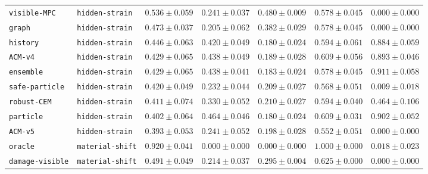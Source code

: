 \documentclass{article}
\begin{document}
\begin{center}
\begin{tabular}{llccccc}
\texttt{visible-MPC} & \texttt{hidden-strain} & $0.536 \pm 0.059$ & $0.241 \pm 0.037$ & $0.480 \pm 0.009$ & $0.578 \pm 0.045$ & $0.000 \pm 0.000$ \\
\texttt{graph} & \texttt{hidden-strain} & $0.473 \pm 0.037$ & $0.205 \pm 0.062$ & $0.382 \pm 0.029$ & $0.578 \pm 0.045$ & $0.000 \pm 0.000$ \\
\texttt{history} & \texttt{hidden-strain} & $0.446 \pm 0.063$ & $0.420 \pm 0.049$ & $0.180 \pm 0.024$ & $0.594 \pm 0.061$ & $0.884 \pm 0.059$ \\
\texttt{ACM-v4} & \texttt{hidden-strain} & $0.429 \pm 0.065$ & $0.438 \pm 0.049$ & $0.189 \pm 0.028$ & $0.609 \pm 0.056$ & $0.893 \pm 0.046$ \\
\texttt{ensemble} & \texttt{hidden-strain} & $0.429 \pm 0.065$ & $0.438 \pm 0.041$ & $0.183 \pm 0.024$ & $0.578 \pm 0.045$ & $0.911 \pm 0.058$ \\
\texttt{safe-particle} & \texttt{hidden-strain} & $0.420 \pm 0.049$ & $0.232 \pm 0.044$ & $0.209 \pm 0.027$ & $0.568 \pm 0.051$ & $0.009 \pm 0.018$ \\
\texttt{robust-CEM} & \texttt{hidden-strain} & $0.411 \pm 0.074$ & $0.330 \pm 0.052$ & $0.210 \pm 0.027$ & $0.594 \pm 0.040$ & $0.464 \pm 0.106$ \\
\texttt{particle} & \texttt{hidden-strain} & $0.402 \pm 0.064$ & $0.464 \pm 0.046$ & $0.180 \pm 0.024$ & $0.609 \pm 0.031$ & $0.902 \pm 0.052$ \\
\texttt{ACM-v5} & \texttt{hidden-strain} & $0.393 \pm 0.053$ & $0.241 \pm 0.052$ & $0.198 \pm 0.028$ & $0.552 \pm 0.051$ & $0.000 \pm 0.000$ \\
\texttt{oracle} & \texttt{material-shift} & $0.920 \pm 0.041$ & $0.000 \pm 0.000$ & $0.000 \pm 0.000$ & $1.000 \pm 0.000$ & $0.018 \pm 0.023$ \\
\texttt{damage-visible} & \texttt{material-shift} & $0.491 \pm 0.049$ & $0.214 \pm 0.037$ & $0.295 \pm 0.004$ & $0.625 \pm 0.000$ & $0.000 \pm 0.000$ \\
\bottomrule
\end{tabular}
\end{center}
\end{document}
